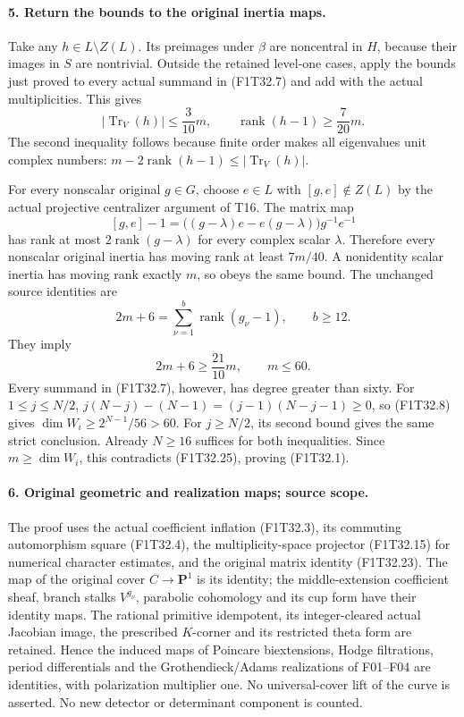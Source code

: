 \paragraph{5. Return the bounds to the original inertia maps.}
Take any \(h\in L\setminus Z(L)\). Its preimages
under \(\beta\) are noncentral in \(H\), because
their images in \(S\) are nontrivial.
Outside the retained level-one cases, apply the bounds
just proved to every actual summand in (F1T32.7) and
add with the actual multiplicities. This gives
\[
 |\operatorname{Tr}_V(h)|\le\frac3{10}m,
 \qquad
 \operatorname{rank}(h-1)\ge\frac7{20}m.
 \tag{F1T32.22}
\]
The second inequality follows because finite order
makes all eigenvalues unit complex numbers:
\(m-2\operatorname{rank}(h-1)\le
 |\operatorname{Tr}_V(h)|\).

For every nonscalar original \(g\in G\), choose
\(e\in L\) with \([g,e]\notin Z(L)\) by the actual
projective centralizer argument of T16. The matrix map
\[
 [g,e]-1=
   \bigl((g-\lambda)e-e(g-\lambda)\bigr)g^{-1}e^{-1}
 \tag{F1T32.23}
\]
has rank at most \(2\operatorname{rank}(g-\lambda)\)
for every complex scalar \(\lambda\). Therefore every
nonscalar original inertia has moving rank at least
\(7m/40\). A nonidentity scalar inertia has moving
rank exactly \(m\), so obeys the same bound.
The unchanged source identities are
\[
 2m+6=\sum_{\nu=1}^b\operatorname{rank}(g_\nu-1),
 \qquad b\ge12.
 \tag{F1T32.24}
\]
They imply
\[
          2m+6\ge\frac{21}{10}m,
          \qquad m\le60.
 \tag{F1T32.25}
\]
Every summand in (F1T32.7), however, has degree
greater than sixty. For \(1\le j\le N/2\),
\(j(N-j)-(N-1)=(j-1)(N-j-1)\ge0\), so (F1T32.8) gives
\(\dim W_i\ge2^{N-1}/56>60\).
For \(j\ge N/2\), its second bound gives the same
strict conclusion. Already \(N\ge16\) suffices for
both inequalities. Since \(m\ge\dim W_i\), this
contradicts (F1T32.25), proving (F1T32.1).

\paragraph{6. Original geometric and realization maps; source scope.}
The proof uses the actual coefficient inflation
(F1T32.3), its commuting automorphism square
(F1T32.4), the multiplicity-space projector
(F1T32.15) for numerical character estimates, and the
original matrix identity (F1T32.23). The map of the
original cover \(C\to\mathbf P^1\) is its identity;
the middle-extension coefficient sheaf, branch stalks
\(V^{g_\nu}\), parabolic cohomology and its cup form
have their identity maps. The rational primitive
idempotent, its integer-cleared actual Jacobian image,
the prescribed \(K\)-corner and its restricted theta
form are retained. Hence the induced maps of Poincare
biextensions, Hodge filtrations, period differentials
and the Grothendieck/Adams realizations of F01--F04
are identities, with polarization multiplier one.
No universal-cover lift of the curve is asserted.
No new detector or determinant component is counted.

